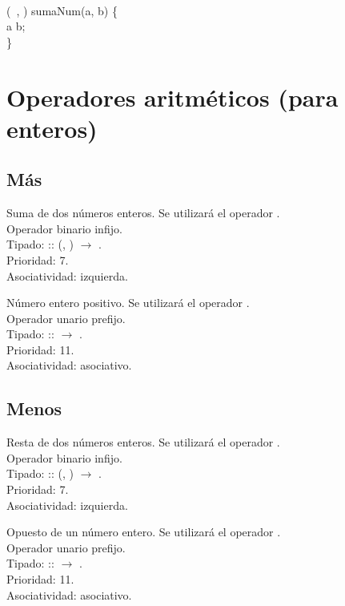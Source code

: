 \begin{algorithm}
	 \\
	 \Integer{}(\Val \, \Integer{} , ) 
	 sumaNum(a, b) \{ \\
	 \quad {} a \operator{+} b;  \\
	 \} \;
\end{algorithm}


\section{Operadores aritméticos (para enteros)}

\subsection*{Más}
Suma de dos números enteros. Se utilizará el operador \Sum. 
\\Operador  binario infijo.
\\Tipado: \Sum :: (\Integer, \Integer) $\rightarrow$ \Integer. \\Prioridad: 7.
\\Asociatividad: izquierda.

Número entero positivo. Se utilizará el operador \Sum. 
\\Operador  unario prefijo.
\\Tipado: \Sum :: \Integer $\rightarrow$  \Integer. \\Prioridad: 11.
\\Asociatividad: asociativo.

\subsection*{Menos}

Resta de dos números enteros. Se utilizará el operador \Sub. 
\\Operador  binario infijo.
\\Tipado: \Sub :: (\Integer, \Integer) $\rightarrow$  \Integer. \\Prioridad: 7.
\\Asociatividad: izquierda.

Opuesto de un número entero. Se utilizará el operador \Sub. 
\\Operador  unario prefijo.
\\Tipado: \Sub :: \Integer $\rightarrow$  \Integer. \\Prioridad: 11.
\\Asociatividad: asociativo.



